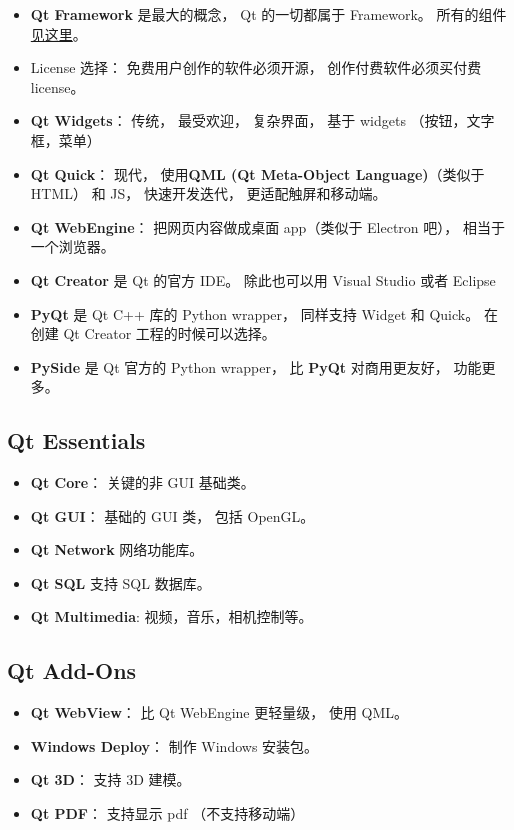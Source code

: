 
\begin{issues}
\issueDraft
\end{issues}

\begin{itemize}
\item \textbf{Qt Framework} 是最大的概念， Qt 的一切都属于 Framework。 所有的组件\href{https://doc.qt.io/qt-6/qtmodules.html}{见这里}。
\item License 选择： 免费用户创作的软件必须开源， 创作付费软件必须买付费 license。
\item \textbf{Qt Widgets}： 传统， 最受欢迎， 复杂界面， 基于 widgets （按钮，文字框，菜单）
\item \textbf{Qt Quick}： 现代， 使用\textbf{QML (Qt Meta-Object Language)}（类似于 HTML） 和 JS， 快速开发迭代， 更适配触屏和移动端。
\item \textbf{Qt WebEngine}： 把网页内容做成桌面 app（类似于 Electron 吧）， 相当于一个浏览器。
\item \textbf{Qt Creator} 是 Qt 的官方 IDE。 除此也可以用 Visual Studio 或者 Eclipse
\item \textbf{PyQt} 是 Qt C++ 库的 Python wrapper， 同样支持 Widget 和 Quick。 在创建 Qt Creator 工程的时候可以选择。
\item \textbf{PySide} 是 Qt 官方的 Python wrapper， 比 \textbf{PyQt} 对商用更友好， 功能更多。
\end{itemize}

\subsection{Qt Essentials}
\begin{itemize}
\item \textbf{Qt Core}： 关键的非 GUI 基础类。
\item \textbf{Qt GUI}： 基础的 GUI 类， 包括 OpenGL。
\item \textbf{Qt Network} 网络功能库。
\item \textbf{Qt SQL} 支持 SQL 数据库。
\item \textbf{Qt Multimedia}: 视频，音乐，相机控制等。
\end{itemize}

\subsection{Qt Add-Ons}
\begin{itemize}
\item \textbf{Qt WebView}： 比 Qt WebEngine 更轻量级， 使用 QML。
\item \textbf{Windows Deploy}： 制作 Windows 安装包。
\item \textbf{Qt 3D}： 支持 3D 建模。
\item \textbf{Qt PDF}： 支持显示 pdf （不支持移动端）
\end{itemize}



